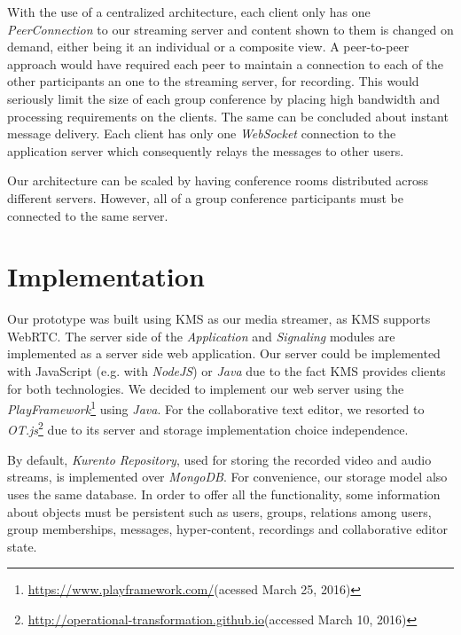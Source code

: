 \documentclass[10pt,conference]{IEEEtran}
\begin{document}
With the use of a centralized architecture, each client only has one \emph{PeerConnection} to our streaming server and content shown to them is changed on demand, either being it an individual or a composite view. 
A peer-to-peer approach would have required each peer to maintain a connection to each of the other participants an one to the streaming server, for recording.
This would seriously limit the size of each group conference by placing high bandwidth and processing requirements on the clients. 
The same can be concluded about instant message delivery.
Each client has only one \emph{WebSocket} connection to the application server which consequently relays the messages to other users.

Our architecture can be scaled by having conference rooms distributed across different servers.
However, all of a group conference participants must be connected to the same server.









\section{Implementation}
\label{chapter:implementation}


Our prototype was built using \gls{KMS} as our media streamer, as \gls{KMS} supports \gls{WebRTC}.
The server side of the \emph{Application} and \emph{Signaling} modules are implemented as a server side web application. 
Our server could be implemented with JavaScript (e.g. with \emph{NodeJS}) or \emph{Java} due to the fact \gls{KMS} provides clients for both technologies. 
We decided to implement our web server using the \emph{PlayFramework}\footnote{\url{https://www.playframework.com/}(acessed March 25, 2016)} using \emph{Java}.
For the collaborative text editor, we resorted to \emph{OT.js}\footnote{\url{http://operational-transformation.github.io}(accessed March 10, 2016)} due to its server and storage implementation choice independence.

By default, \emph{Kurento Repository}, used for storing the recorded video and audio streams, is implemented over \emph{MongoDB}.
For convenience, our storage model also uses the same database.
In order to offer all the functionality, some information about objects must be persistent such as users, groups, relations among users, group memberships, messages, hyper-content, recordings and collaborative editor state. 
\end{document}

